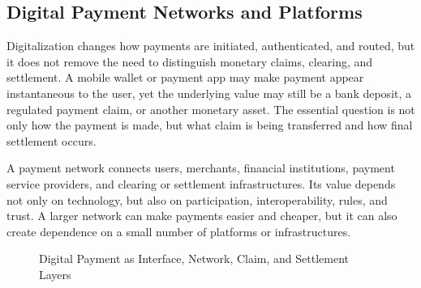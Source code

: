 \subsection{Digital Payment Networks and Platforms}

Digitalization changes how payments are initiated, authenticated, and routed, but it does not remove the need to distinguish monetary claims, clearing, and settlement. A mobile wallet or payment app may make payment appear instantaneous to the user, yet the underlying value may still be a bank deposit, a regulated payment claim, or another monetary asset. The essential question is not only how the payment is made, but what claim is being transferred and how final settlement occurs.

A payment network connects users, merchants, financial institutions, payment service providers, and clearing or settlement infrastructures. Its value depends not only on technology, but also on participation, interoperability, rules, and trust. A larger network can make payments easier and cheaper, but it can also create dependence on a small number of platforms or infrastructures.

\begin{figure}[H]
\centering


\caption{Digital Payment as Interface, Network, Claim, and Settlement Layers}
\label{fig:ch2-digital-payment-layers}
\end{figure}

